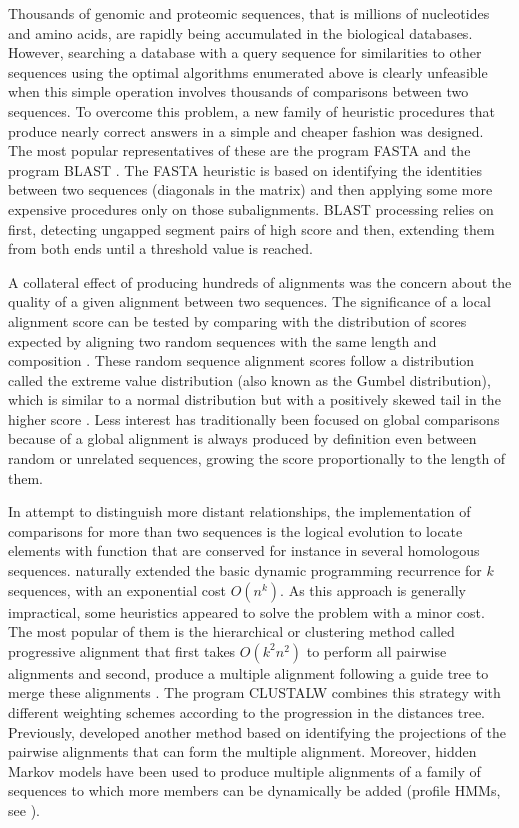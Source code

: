 Thousands of genomic and proteomic sequences, that is millions of nucleotides and amino acids,
are rapidly being accumulated in the biological databases. However, searching a database with a query 
sequence for similarities to other sequences using the optimal algorithms enumerated above
is clearly unfeasible when this simple operation involves thousands of comparisons between two sequences.
To overcome this problem, a new family of heuristic procedures that produce nearly correct answers in
a simple and cheaper fashion was designed. The most popular representatives of these are the program
FASTA \citep{pearson:1988a} and the program BLAST \citep{altschul:1990a}. The FASTA heuristic is based
on identifying the identities between two sequences (diagonals in the matrix) and then applying 
some more expensive procedures only on those subalignments. BLAST processing relies on first, detecting
ungapped segment pairs of high score and then, extending them from both ends until a threshold value
is reached. 

A collateral effect of producing hundreds of alignments was the concern about the quality of a
given alignment between two sequences. The significance of a local alignment score can be tested by 
comparing with the distribution of scores expected by aligning two random sequences with the same length 
and composition \citep{karlin:1990a}. These random sequence alignment scores follow a distribution called
the extreme value distribution (also known as the Gumbel distribution), which is similar to a normal
distribution but with a positively skewed tail in the higher score \citep{gumbel:1962a}. Less interest 
has traditionally been focused on global comparisons because of a global alignment is always produced by 
definition even between random or unrelated sequences, growing the score proportionally to the length of 
them.

In attempt to distinguish more distant relationships, the implementation of comparisons for more than 
two sequences is the logical evolution to locate elements with function that are conserved for instance 
in several homologous sequences.
\citet{waterman:1976a} naturally extended the basic dynamic programming recurrence for $k$ sequences, with
an exponential cost $O(n^k)$. As this approach is generally impractical, some heuristics
appeared to solve the problem with a minor cost. The most popular of them is the hierarchical or 
clustering method called progressive alignment that first takes $O(k^2 n^2)$ to perform all pairwise 
alignments and second, produce a multiple alignment following a guide tree to merge these alignments 
\citep{feng:1987a}. The program CLUSTALW \citep{thompson:1994a} combines this strategy with different 
weighting schemes according to the progression in the distances tree. Previously, \citet{carrillo:1988a} 
developed another method based on identifying the projections of the pairwise alignments that can form the multiple 
alignment. Moreover, hidden Markov models have been used to produce multiple alignments of a family of
sequences to which more members can be dynamically be added (profile HMMs, see \citealp{durbin:1998a}).

